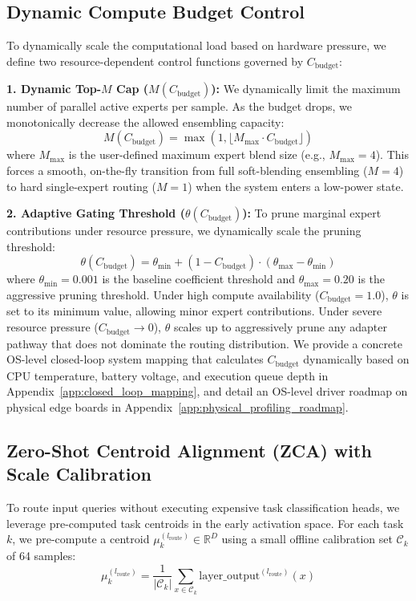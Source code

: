 \subsection{Dynamic Compute Budget Control}
To dynamically scale the computational load based on hardware pressure, we define two resource-dependent control functions governed by $C_{\text{budget}}$:

\textbf{1. Dynamic Top-$M$ Cap ($M(C_{\text{budget}})$):}
We dynamically limit the maximum number of parallel active experts per sample. As the budget drops, we monotonically decrease the allowed ensembling capacity:
\begin{equation}
M(C_{\text{budget}}) = \max\left(1, \lfloor M_{\max} \cdot C_{\text{budget}} \rfloor\right)
\label{eq:topm_cap}
\end{equation}
where $M_{\max}$ is the user-defined maximum expert blend size (e.g., $M_{\max} = 4$). This forces a smooth, on-the-fly transition from full soft-blending ensembling ($M=4$) to hard single-expert routing ($M=1$) when the system enters a low-power state.

\textbf{2. Adaptive Gating Threshold ($\theta(C_{\text{budget}})$):}
To prune marginal expert contributions under resource pressure, we dynamically scale the pruning threshold:
\begin{equation}
\theta(C_{\text{budget}}) = \theta_{\min} + (1 - C_{\text{budget}}) \cdot (\theta_{\max} - \theta_{\min})
\label{eq:theta}
\end{equation}
where $\theta_{\min} = 0.001$ is the baseline coefficient threshold and $\theta_{\max} = 0.20$ is the aggressive pruning threshold. Under high compute availability ($C_{\text{budget}} = 1.0$), $\theta$ is set to its minimum value, allowing minor expert contributions. Under severe resource pressure ($C_{\text{budget}} \to 0$), $\theta$ scales up to aggressively prune any adapter pathway that does not dominate the routing distribution. We provide a concrete OS-level closed-loop system mapping that calculates $C_{\text{budget}}$ dynamically based on CPU temperature, battery voltage, and execution queue depth in Appendix~\ref{app:closed_loop_mapping}, and detail an OS-level driver roadmap on physical edge boards in Appendix~\ref{app:physical_profiling_roadmap}.

\subsection{Zero-Shot Centroid Alignment (ZCA) with Scale Calibration}
To route input queries without executing expensive task classification heads, we leverage pre-computed task centroids in the early activation space. For each task $k$, we pre-compute a centroid $\mu^{(l_{\text{route}})}_k \in \mathbb{R}^D$ using a small offline calibration set $\mathcal{C}_k$ of 64 samples:
\begin{equation}
\mu^{(l_{\text{route}})}_k = \frac{1}{|\mathcal{C}_k|} \sum_{x \in \mathcal{C}_k} \text{layer\_output}^{(l_{\text{route}})}(x)
\label{eq:centroid}
\end{equation}

